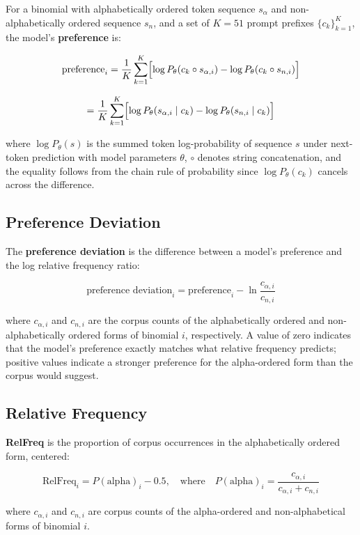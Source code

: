 \documentclass{article}
\begin{document}
For a binomial with alphabetically ordered token sequence \(s_\alpha\)
and non-alphabetically ordered sequence \(s_n\), and a set of \(K = 51\)
prompt prefixes \(\{c_k\}_{k=1}^{K}\), the model's \textbf{preference}
is:

\[\text{preference}_i = \frac{1}{K}\sum_{k=1}^{K}\Bigl[\log P_\theta(c_k \circ s_{\alpha,i}) - \log P_\theta(c_k \circ s_{n,i})\Bigr]\]

\[= \frac{1}{K}\sum_{k=1}^{K}\Bigl[\log P_\theta(s_{\alpha,i} \mid c_k) - \log P_\theta(s_{n,i} \mid c_k)\Bigr]\]

where \(\log P_\theta(s)\) is the summed token log-probability of
sequence \(s\) under next-token prediction with model parameters
\(\theta\), \(\circ\) denotes string concatenation, and the equality
follows from the chain rule of probability since \(\log P_\theta(c_k)\)
cancels across the difference.

\subsection{Preference Deviation}\label{sec-def-prefdev}

The \textbf{preference deviation} is the difference between a model's
preference and the log relative frequency ratio:

\[\text{preference deviation}_i = \text{preference}_i - \ln\frac{c_{\alpha,i}}{c_{n,i}}\]

where \(c_{\alpha,i}\) and \(c_{n,i}\) are the corpus counts of the
alphabetically ordered and non-alphabetically ordered forms of binomial
\(i\), respectively. A value of zero indicates that the model's
preference exactly matches what relative frequency predicts; positive
values indicate a stronger preference for the alpha-ordered form than
the corpus would suggest.

\subsection{Relative Frequency}\label{sec-def-relfreq}

\textbf{RelFreq} is the proportion of corpus occurrences in the
alphabetically ordered form, centered:

\[\text{RelFreq}_i = P(\text{alpha})_i - 0.5, \quad \text{where} \quad P(\text{alpha})_i = \frac{c_{\alpha,i}}{c_{\alpha,i} + c_{n,i}}\]

where \(c_{\alpha,i}\) and \(c_{n,i}\) are corpus counts of the
alpha-ordered and non-alphabetical forms of binomial \(i\).
\end{document}

